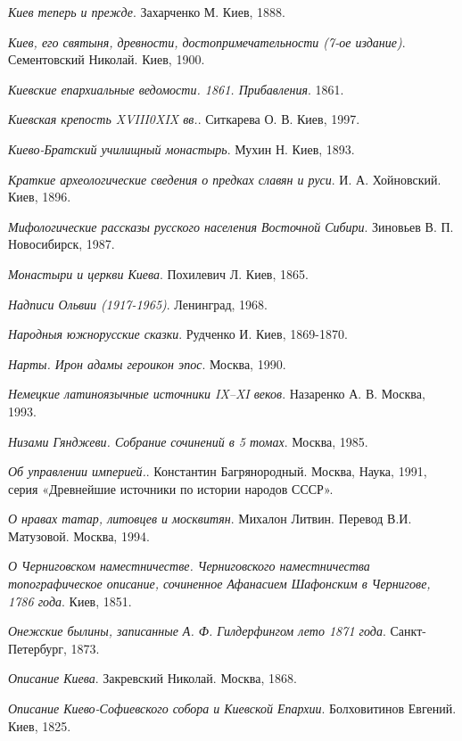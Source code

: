 \emph{Киев теперь и прежде}. Захарченко М. Киев, 1888.

\emph{Киев, его святыня, древности, достопримечательности (7-ое издание)}. Сементовский Николай. Киев, 1900.

\emph{Киевские епархиальные ведомости. 1861. Прибавления}. 1861.

\emph{Киевская крепость XVIII0XIX вв.}. Ситкарева О. В. Киев, 1997.

\emph{Киево-Братский училищный монастырь}. Мухин Н. Киев, 1893.

\emph{Краткие археологические сведения о предках славян и руси}. И. А. Хойновский. Киев, 1896.

\emph{Мифологические рассказы русского населения Восточной Сибири}. Зиновьев В. П. Новосибирск, 1987.

\emph{Монастыри и церкви Киева}. Похилевич Л. Киев, 1865.

\emph{Надписи Ольвии (1917-1965)}. Ленинград, 1968. 

\emph{Народныя южнорусские сказки}. Рудченко И. Киев, 1869-1870.

\emph{Нарты. Ирон адамы героикон эпос}. Москва, 1990.

\emph{Немецкие латиноязычные источники IX–XI веков}. Назаренко А. В. Москва, 1993.

\emph{Низами Гянджеви. Собрание сочинений в 5 томах}. Москва, 1985.

\emph{Об управлении империей.}. Константин Багрянородный. Москва, Наука, 1991, серия «Древнейшие источники по истории народов СССР».

\emph{О нравах татар, литовцев и москвитян}. Михалон Литвин. Перевод В.И. Матузовой. Москва, 1994.

\emph{О Черниговском наместничестве. Черниговского наместничества топографическое описание, сочиненное Афанасием Шафонским в Чернигове, 1786 года}. Киев, 1851.

\emph{Онежские былины, записанные А. Ф. Гилдерфингом лето 1871 года}. Санкт-Петербург, 1873.

\emph{Описание Киева}. Закревский Николай. Москва, 1868.

\emph{Описание Киево-Софиевского собора и Киевской Епархии}. Болховитинов Евгений. Киев, 1825.

